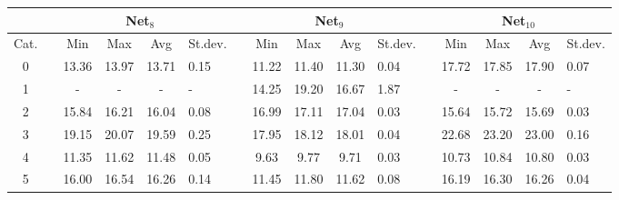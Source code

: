 \begin{table}
{\scriptsize{}}%
\begin{tabular}{ccccc>{\centering}p{0.75cm}cccc>{\centering}p{0.75cm}cccc>{\centering}p{0.75cm}}
\cline{3-16} 
 &  &  & \multicolumn{2}{c}{{\scriptsize{Net$_{8}$}}} &  &  &  & \multicolumn{2}{c}{{\scriptsize{Net$_{9}$}}} &  &  &  & \multicolumn{2}{c}{{\scriptsize{Net$_{10}$}}} & \tabularnewline
\hline 
{\scriptsize{Cat.}} &  & {\scriptsize{Min}} & {\scriptsize{Max}} & {\scriptsize{Avg}} & {\scriptsize{St.dev.}} &  & {\scriptsize{Min}} & {\scriptsize{Max}} & {\scriptsize{Avg}} & {\scriptsize{St.dev.}} &  & {\scriptsize{Min}} & {\scriptsize{Max}} & {\scriptsize{Avg}} & {\scriptsize{St.dev.}}\tabularnewline
\hline 
{\scriptsize{0}} &  & {\scriptsize{13.36}} & {\scriptsize{13.97}} & {\scriptsize{13.71}} & {\scriptsize{0.15}} &  & {\scriptsize{11.22}} & {\scriptsize{11.40}} & {\scriptsize{11.30}} & {\scriptsize{0.04}} &  & {\scriptsize{17.72}} & {\scriptsize{17.85}} & {\scriptsize{17.90}} & {\scriptsize{0.07}}\tabularnewline
\cline{1-6} \cline{8-11} \cline{13-16} 
{\scriptsize{1}} &  & {\scriptsize{-}} & {\scriptsize{-}} & {\scriptsize{-}} & {\scriptsize{-}} &  & {\scriptsize{14.25}} & {\scriptsize{19.20}} & {\scriptsize{16.67}} & {\scriptsize{1.87}} &  & {\scriptsize{-}} & {\scriptsize{-}} & {\scriptsize{-}} & {\scriptsize{-}}\tabularnewline
\cline{1-6} \cline{8-11} \cline{13-16} 
{\scriptsize{2}} &  & {\scriptsize{15.84}} & {\scriptsize{16.21}} & {\scriptsize{16.04}} & {\scriptsize{0.08}} &  & {\scriptsize{16.99}} & {\scriptsize{17.11}} & {\scriptsize{17.04}} & {\scriptsize{0.03}} &  & {\scriptsize{15.64}} & {\scriptsize{15.72}} & {\scriptsize{15.69}} & {\scriptsize{0.03}}\tabularnewline
\cline{1-6} \cline{8-11} \cline{13-16} 
{\scriptsize{3}} &  & {\scriptsize{19.15}} & {\scriptsize{20.07}} & {\scriptsize{19.59}} & {\scriptsize{0.25}} &  & {\scriptsize{17.95}} & {\scriptsize{18.12}} & {\scriptsize{18.01}} & {\scriptsize{0.04}} &  & {\scriptsize{22.68}} & {\scriptsize{23.20}} & {\scriptsize{23.00}} & {\scriptsize{0.16}}\tabularnewline
\cline{1-6} \cline{8-11} \cline{13-16} 
{\scriptsize{4}} &  & {\scriptsize{11.35}} & {\scriptsize{11.62}} & {\scriptsize{11.48}} & {\scriptsize{0.05}} &  & {\scriptsize{9.63}} & {\scriptsize{9.77}} & {\scriptsize{9.71}} & {\scriptsize{0.03}} &  & {\scriptsize{10.73}} & {\scriptsize{10.84}} & {\scriptsize{10.80}} & {\scriptsize{0.03}}\tabularnewline
\cline{1-6} \cline{8-11} \cline{13-16} 
{\scriptsize{5}} &  & {\scriptsize{16.00}} & {\scriptsize{16.54}} & {\scriptsize{16.26}} & {\scriptsize{0.14}} &  & {\scriptsize{11.45}} & {\scriptsize{11.80}} & {\scriptsize{11.62}} & {\scriptsize{0.08}} &  & {\scriptsize{16.19}} & {\scriptsize{16.30}} & {\scriptsize{16.26}} & {\scriptsize{0.04}}\tabularnewline

\end{tabular}
\end{table}
